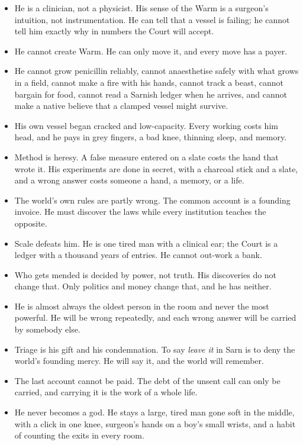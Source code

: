 \documentclass{design/chronicle}
\begin{document}
\begin{itemize}[leftmargin=1.4em,itemsep=1pt,topsep=3pt,parsep=0pt]

\item He is a clinician, not a physicist. His sense of the Warm is a surgeon’s intuition, not instrumentation. He can tell that a vessel is failing; he cannot tell him exactly why in numbers the Court will accept.

\item He cannot create Warm. He can only move it, and every move has a payer.

\item He cannot grow penicillin reliably, cannot anaesthetise safely with what grows in a field, cannot make a fire with his hands, cannot track a beast, cannot bargain for food, cannot read a Sarnish ledger when he arrives, and cannot make a native believe that a clamped vessel might survive.

\item His own vessel began cracked and low-capacity. Every working costs him head, and he pays in grey fingers, a bad knee, thinning sleep, and memory.

\item Method is heresy. A false measure entered on a slate costs the hand that wrote it. His experiments are done in secret, with a charcoal stick and a slate, and a wrong answer costs someone a hand, a memory, or a life.

\item The world’s own rules are partly wrong. The common account is a founding invoice. He must discover the laws while every institution teaches the opposite.

\item Scale defeats him. He is one tired man with a clinical ear; the Court is a ledger with a thousand years of entries. He cannot out-work a bank.

\item Who gets mended is decided by power, not truth. His discoveries do not change that. Only politics and money change that, and he has neither.

\item He is almost always the oldest person in the room and never the most powerful. He will be wrong repeatedly, and each wrong answer will be carried by somebody else.

\item Triage is his gift and his condemnation. To say \emph{leave it} in Sarn is to deny the world’s founding mercy. He will say it, and the world will remember.

\item The last account cannot be paid. The debt of the unsent call can only be carried, and carrying it is the work of a whole life.

\item He never becomes a god. He stays a large, tired man gone soft in the middle, with a click in one knee, surgeon’s hands on a boy’s small wrists, and a habit of counting the exits in every room.

\end{itemize}
\end{document}
